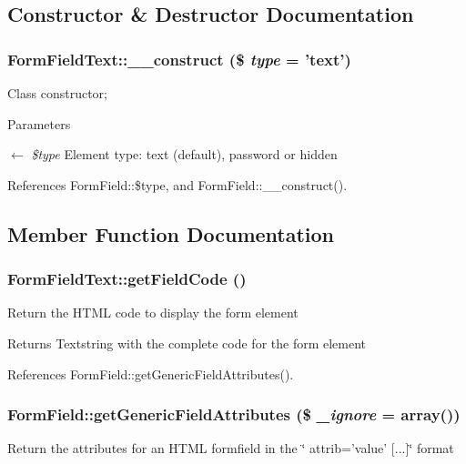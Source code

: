 \subsection{Constructor \& Destructor Documentation}
\subsubsection[{\_\-\_\-construct}]{\setlength{\rightskip}{0pt plus 5cm}FormFieldText::\_\-\_\-construct (\$ {\em type} = {\ttfamily 'text'})}\label{classFormFieldText_a19f605d6195d340c6ddf9a298706b9cd}
Class constructor; 
\begin{DoxyParams}{Parameters}
\item[\mbox{$\leftarrow$} {\em \$type}]Element type: text (default), password or hidden \end{DoxyParams}


References FormField::\$type, and FormField::\_\-\_\-construct().



\subsection{Member Function Documentation}
\subsubsection[{getFieldCode}]{\setlength{\rightskip}{0pt plus 5cm}FormFieldText::getFieldCode ()}\label{classFormFieldText_aebbf56aba1fd099619a360ac259633fa}
Return the HTML code to display the form element

\begin{DoxyReturn}{Returns}
Textstring with the complete code for the form element 
\end{DoxyReturn}


References FormField::getGenericFieldAttributes().

\subsubsection[{getGenericFieldAttributes}]{\setlength{\rightskip}{0pt plus 5cm}FormField::getGenericFieldAttributes (\$ {\em \_\-ignore} = {\ttfamily array()})}\label{classFormField_a9f9d136ba8b4a793f22370aff43d592d}
Return the attributes for an HTML formfield in the \char`\"{} attrib='value' \mbox{[}...\mbox{]}\char`\"{} format


